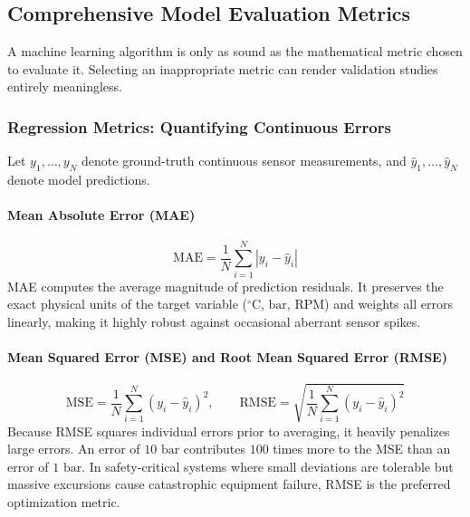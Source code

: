 \subsection{Comprehensive Model Evaluation Metrics}\label{subsec:metrics}

A machine learning algorithm is only as sound as the mathematical metric chosen to evaluate it. Selecting an inappropriate metric can render validation studies entirely meaningless.

\subsubsection{Regression Metrics: Quantifying Continuous Errors}

Let $y_1, \dots, y_N$ denote ground-truth continuous sensor measurements, and $\hat{y}_1, \dots, \hat{y}_N$ denote model predictions.

\paragraph{Mean Absolute Error (MAE)}
\begin{equation}
\text{MAE} = \frac{1}{N}\sum_{i=1}^N |y_i - \hat{y}_i|\label{eq:mae}
\end{equation}
MAE computes the average magnitude of prediction residuals. It preserves the exact physical units of the target variable ($^\circ\text{C}$, $\text{bar}$, $\text{RPM}$) and weights all errors linearly, making it highly robust against occasional aberrant sensor spikes.

\paragraph{Mean Squared Error (MSE) and Root Mean Squared Error (RMSE)}
\begin{equation}
\text{MSE} = \frac{1}{N}\sum_{i=1}^N (y_i - \hat{y}_i)^2, \qquad \text{RMSE} = \sqrt{\frac{1}{N}\sum_{i=1}^N (y_i - \hat{y}_i)^2}\label{eq:rmse}
\end{equation}
Because RMSE squares individual errors prior to averaging, it heavily penalizes large errors. An error of $10\text{ bar}$ contributes $100$ times more to the MSE than an error of $1\text{ bar}$. In safety-critical systems where small deviations are tolerable but massive excursions cause catastrophic equipment failure, RMSE is the preferred optimization metric.

